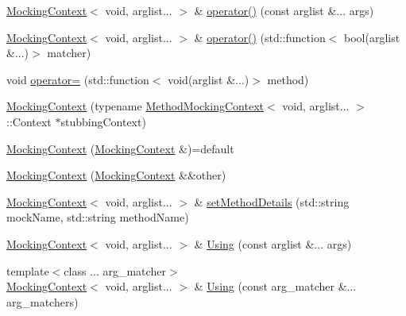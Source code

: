 \begin{DoxyCompactItemize}
\item 
\mbox{\hyperlink{classfakeit_1_1MockingContext}{Mocking\+Context}}$<$ void, arglist... $>$ \& \mbox{\hyperlink{classfakeit_1_1MockingContext_3_01void_00_01arglist_8_8_8_01_4_a73476d376f7ec5631ba9a37ff5264599}{operator()}} (const arglist \&... args)
\item 
\mbox{\hyperlink{classfakeit_1_1MockingContext}{Mocking\+Context}}$<$ void, arglist... $>$ \& \mbox{\hyperlink{classfakeit_1_1MockingContext_3_01void_00_01arglist_8_8_8_01_4_a1a5a55569a763877d395635979e6b3d6}{operator()}} (std\+::function$<$ bool(arglist \&...)$>$ matcher)
\item 
void \mbox{\hyperlink{classfakeit_1_1MockingContext_3_01void_00_01arglist_8_8_8_01_4_a86584df9e9a7a73b078ad68fa5893d50}{operator=}} (std\+::function$<$ void(arglist \&...)$>$ method)
\item 
\mbox{\hyperlink{classfakeit_1_1MockingContext_3_01void_00_01arglist_8_8_8_01_4_a655f7e31674dfb282f30a94f31ffd2a7}{Mocking\+Context}} (typename \mbox{\hyperlink{classfakeit_1_1MethodMockingContext}{Method\+Mocking\+Context}}$<$ void, arglist... $>$\+::Context $\ast$stubbing\+Context)
\item 
\mbox{\hyperlink{classfakeit_1_1MockingContext_3_01void_00_01arglist_8_8_8_01_4_a750dcc8fb80a9931c41143ce73d7177c}{Mocking\+Context}} (\mbox{\hyperlink{classfakeit_1_1MockingContext}{Mocking\+Context}} \&)=default
\item 
\mbox{\hyperlink{classfakeit_1_1MockingContext_3_01void_00_01arglist_8_8_8_01_4_a1f7b3663809191b919290f0db05d59f1}{Mocking\+Context}} (\mbox{\hyperlink{classfakeit_1_1MockingContext}{Mocking\+Context}} \&\&other)
\item 
\mbox{\hyperlink{classfakeit_1_1MockingContext}{Mocking\+Context}}$<$ void, arglist... $>$ \& \mbox{\hyperlink{classfakeit_1_1MockingContext_3_01void_00_01arglist_8_8_8_01_4_a5479ea5b1a1f32898cc9592bfb1c7777}{set\+Method\+Details}} (std\+::string mock\+Name, std\+::string method\+Name)
\item 
\mbox{\hyperlink{classfakeit_1_1MockingContext}{Mocking\+Context}}$<$ void, arglist... $>$ \& \mbox{\hyperlink{classfakeit_1_1MockingContext_3_01void_00_01arglist_8_8_8_01_4_a0dad4e59214a5fdcacad0e4a170df071}{Using}} (const arglist \&... args)
\item 
{\footnotesize template$<$class ... arg\+\_\+matcher$>$ }\\\mbox{\hyperlink{classfakeit_1_1MockingContext}{Mocking\+Context}}$<$ void, arglist... $>$ \& \mbox{\hyperlink{classfakeit_1_1MockingContext_3_01void_00_01arglist_8_8_8_01_4_aaab0ad3883ab87bd3885671e3266546e}{Using}} (const arg\+\_\+matcher \&... arg\+\_\+matchers)

\end{DoxyCompactItemize}
